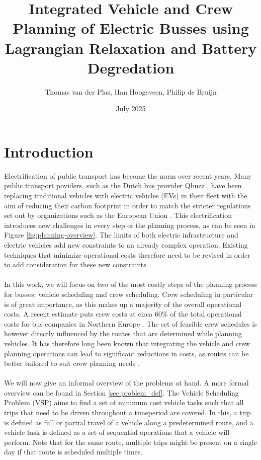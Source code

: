 \documentclass[ht]{article}
\title{Integrated Vehicle and Crew Planning of Electric Busses using Lagrangian Relaxation and Battery Degredation}
\date{July 2025}
\author{Thomas van der Plas, Han Hoogeveen, Philip de Bruijn}
\begin{document}
\maketitle

\section{Introduction}
Electrification of public transport has become the norm over recent years. Many public transport poviders, such as the Dutch bus provider Qbuzz \cite{qbuzzQbuzz}, have been replacing traditional vehicles with electric vehicles (EVs) in their fleet with the aim of reducing their carbon footprint in order to match the stricter regulations set out by organizations such as the European Union \cite{europaRegulation20181999}. This electrification introduces new challenges in every step of the planning process, as can be seen in Figure \ref{fig:planning-overview}. The limits of both electric infrastructure and electric vehicles add new constraints to an already complex operation. Existing techniques that minimize operational costs therefore need to be revised in order to add consideration for these new constraints. \\\\
In this work, we will focus on two of the most costly steps of the planning process for busses: vehicle scheduling and crew scheduling. Crew scheduling in particular is of great importance, as this makes up a majority of the overall operational costs. A recent estimate puts crew costs at circa $60\%$ of the total operational costs for bus companies in Northern Europe \cite{Perumal2019Crew}. The set of feasible crew schedules is however directly influenced by the routes that are determined while planning vehicles. It has therefore long been known that integrating the vehicle and crew planning operations can lead to significant reductions in costs, as routes can be better tailored to suit crew planning needs \cite{Bodin1983}. \\\\
We will now give an informal overview of the problems at hand. A more formal overview can be found in Section \ref{sec:problem_def}. 
The Vehicle Scheduling Problem (VSP) aims to find a set of minimum cost vehicle tasks such that all trips that need to be driven throughout a timeperiod are covered. In this, a trip is defined as full or partial travel of a vehicle along a predetermined route, and a vehicle task is defined as a set of sequential operations that a vehicle will perform. Note that for the same route, multiple trips might be present on a single day if that route is scheduled multiple times. \\
\end{document}
